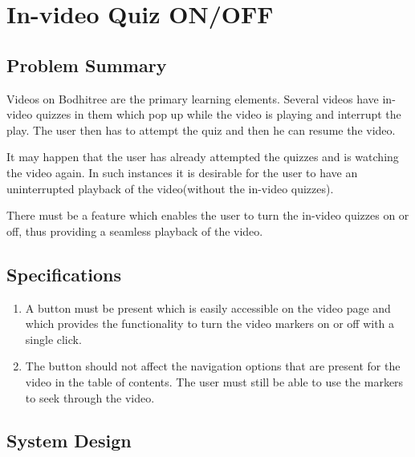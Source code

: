 \section{In-video Quiz ON/OFF}

\subsection{Problem Summary}

\hspace{0.35cm} Videos on Bodhitree are the primary learning elements. Several videos have in-video quizzes in them which pop up while the video is playing and interrupt the play. The user then has to attempt the quiz and then he can resume the video.
\par It may happen that the user has already attempted the quizzes and is watching the video again. In such instances it is desirable for the user to have an uninterrupted playback of the video(without the in-video quizzes).
\par There must be a feature which enables the user to turn the in-video quizzes on or off, thus providing a seamless playback of the video.

\subsection{Specifications}

\begin{enumerate}
	\item A button must be present which is easily accessible on the video page and which provides the functionality to turn the video markers on or off with a single click.
	\item The button should not affect the navigation options that are present for the video in the table of contents. The user must still be able to use the markers to seek through the video.
\end{enumerate}

\subsection{System Design}

